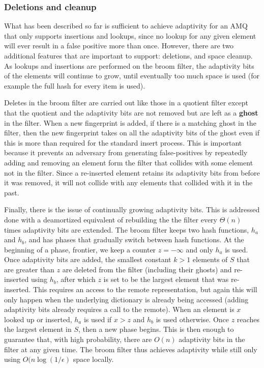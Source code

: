 \documentclass[../paper.tex]{subfiles}
\begin{document}
\subsubsection{Deletions and cleanup}

What has been described so far is sufficient to achieve adaptivity for an AMQ that
only supports insertions and lookups, since no lookup for any given element will
ever result in a false positive more than once. However, there are two additional
features that are important to support: deletions, and space cleanup. As lookups and
insertions are performed on the broom filter, the adaptivity bits of the elements will
continue to grow, until eventually too much space is used (for example the full hash
for every item is used).
     
Deletes in the broom filter are carried out like
those in a quotient filter except that the quotient and the adaptivity
bits are not removed but are left as a {\bf ghost} in the filter.  When a
new fingerprint is added, if there is a matching ghost in the filter, then
the new fingerprint takes on all the adaptivity bits of the ghost even  if
this is more than required for the standard insert process. 
This is important because it prevents an adversary from generating false-positives
by repeatedly adding and removing an element form the filter that collides with
some element not in the filter. Since a re-inserted element retains its
adaptivity bits from before it was removed, it will not collide with any
elements that collided with it in the past.

Finally, there is the issue of continually growing adaptivity bits.
This is addressed done with a deamortized equivalent of rebuilding the the filter
every $\Theta (n)$ times adaptivity bits are extended. The broom filter keeps
two hash functions, $h_a$ and $h_b$, and has phases that
gradually switch between hash functions.  At the beginning of a phase,
frontier, we keep a counter $z = -\infty$ and only $h_a$ is used.  Once adaptivity bits are
added, the smallest constant $k > 1$ elements of $S$ that are greater than
$z$ are deleted from the filter (including their ghosts) and re-inserted
using $h_b$, after which $z$ is set to be the largest element that was
re-inserted.  This requires an access to the remote representation, but
again this will only happen when the underlying dictionary is already
being accessed (adding adaptivity bits already requires a call to the remote).
When an element is $x$ looked up or inserted, $h_a$ is
used if $x > z$ and $h_b$ is used otherwise.  Once $z$ reaches the largest
element in $S$, then a new phase begins.  This is then enough to guarantee
that, with high probability, there are $O(n)$ adaptivity bits in the
filter at any given time.  The broom filter thus achieves adaptivity while
still only using $O(n \log (1/\epsilon)$ space locally.  
\end{document}
